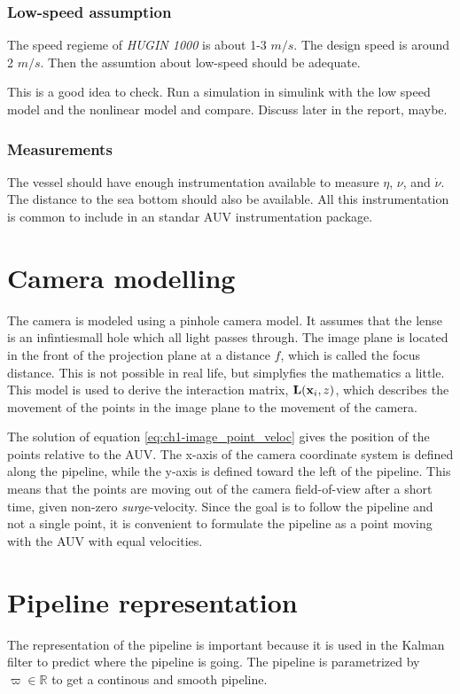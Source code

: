		\subsubsection{Low-speed assumption}
		The speed regieme of \textit{HUGIN 1000} is about 1-3 $m/s$. The design speed is around 2 $m/s$. 
		Then the assumtion about low-speed should be adequate.  

		This is a good idea to check. Run a simulation in simulink with the low speed model and the 
		nonlinear model and compare. Discuss later in the report, maybe.
		
		\subsubsection{Measurements}
		The vessel should have enough instrumentation available to measure $\eta$, $\nu$, and $\dot{\nu}$. 
		The distance to the sea bottom should also be available. All this instrumentation is common to 
		include in an standar AUV instrumentation package. 


\section{Camera modelling}
	The camera is modeled using a pinhole camera model. It assumes that the lense is an infintiesmall hole which 
	all light passes through. The image plane is located in the front of the projection plane at a distance $f$, 
	which is called the focus distance. This is not possible in real life, but simplyfies the mathematics a little. 
	This model is used to derive the interaction matrix, $\mathbf{L}(\mathbf{x}_i, z)$, which describes the movement of the 
	points in the image plane to the movement of the camera.\cite{robotbok} 

	The solution of equation \eqref{eq:ch1-image_point_veloc} gives the position of the points relative
	to the AUV. The x-axis of the camera coordinate system is defined along the pipeline, while the y-axis 
	is defined toward the left of the pipeline. This means that the points are moving out of the camera
	field-of-view after a short time, given non-zero \textit{surge}-velocity. Since the goal is to follow
	the pipeline and not a single point, it is convenient to formulate the pipeline as a point moving with
	the AUV with equal velocities. 

	


\section{Pipeline representation}
	The representation of the pipeline is important because it is used in the Kalman filter to predict
	where the pipeline is going. The pipeline is parametrized by $\varpi \in \mathbb{R}$ to get a
	continous and smooth pipeline.

